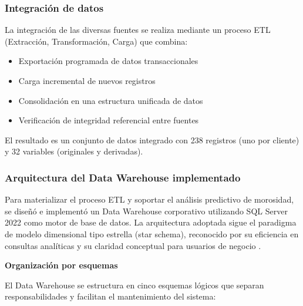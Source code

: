 \subsubsection{Integración de datos}
La integración de las diversas fuentes se realiza mediante un proceso ETL (Extracción, Transformación, Carga) que combina:

\begin{itemize}
    \item Exportación programada de datos transaccionales
    \item Carga incremental de nuevos registros
    \item Consolidación en una estructura unificada de datos
    \item Verificación de integridad referencial entre fuentes
\end{itemize}

El resultado es un conjunto de datos integrado con 238 registros (uno por cliente) y 32 variables (originales y derivadas).
\subsubsection{Arquitectura del Data Warehouse implementado}

Para materializar el proceso ETL y soportar el análisis predictivo de morosidad, se diseñó e implementó un Data Warehouse corporativo utilizando SQL Server 2022 como motor de base de datos. La arquitectura adoptada sigue el paradigma de modelo dimensional tipo estrella (star schema), reconocido por su eficiencia en consultas analíticas y su claridad conceptual para usuarios de negocio \cite{kimball2013toolkit}.

\textbf{Organización por esquemas}

El Data Warehouse se estructura en cinco esquemas lógicos que separan responsabilidades y facilitan el mantenimiento del sistema:

